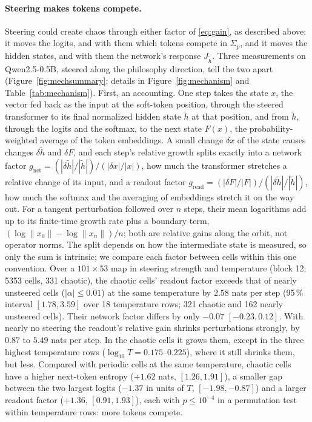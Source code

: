 \documentclass[11pt,letterpaper]{article}
\begin{document}
\paragraph{Steering makes tokens compete.} Steering could create chaos through either factor of \eqref{eq:gain}, as
described above: it moves the logits, and with them which tokens compete in $\Sigma_p$, and it moves the hidden states,
and with them the network's response $J_{\tilde h}$. Three measurements on Qwen2.5-0.5B, steered along the philosophy
direction, tell the two apart (Figure~\ref{fig:mechsummary}; details in Figure~\ref{fig:mechanism} and
Table~\ref{tab:mechanism}). First, an accounting. One step takes the state $x$, the vector fed back as the input at the
soft-token position, through the steered transformer to its final normalized hidden state $\tilde h$ at that
position, and from $\tilde h$, through the logits and the softmax, to the next state $F(x)$, the probability-weighted
average of the token embeddings. A small change $\delta x$ of the state causes changes $\delta\tilde h$ and $\delta F$,
and each step's relative growth splits exactly into a network factor
$g_{\mathrm{net}}=(|\delta\tilde h|/|\tilde h|)/(|\delta x|/|x|)$, how much the transformer stretches a relative change
of its input, and a readout factor $g_{\mathrm{read}}=(|\delta F|/|F|)/(|\delta\tilde h|/|\tilde h|)$, how much the
softmax and the averaging of embeddings stretch it on the way out. For a tangent perturbation followed over $n$ steps,
their mean logarithms add up to its finite-time growth rate plus a boundary term,
$(\log\lVert x_0\rVert-\log\lVert x_n\rVert)/n$; both are relative gains along the orbit, not operator norms. The split
depends on how the intermediate state is measured, so only the sum is intrinsic; we compare each factor between cells
within this one convention. Over a $101\times53$ map in steering strength and temperature
(block 12; 5353 cells, 331 chaotic), the chaotic cells' readout factor exceeds that of nearly unsteered cells
($|\alpha|\le0.01$) at the same temperature by $2.58$ nats per step (95\,\% interval $[1.78,3.59]$ over 18 temperature
rows; 321 chaotic and 162 nearly unsteered cells). Their network factor differs by only $-0.07$ $[-0.23,0.12]$. With
nearly no steering the readout's relative gain shrinks perturbations strongly, by $0.87$ to $5.49$ nats per step. In
the chaotic cells it grows them, except in the three highest temperature rows ($\log_{10}T=0.175$--$0.225$), where it
still shrinks them, but less. Compared with periodic cells at the same temperature,
chaotic cells have a higher next-token entropy ($+1.62$ nats, $[1.26,1.91]$), a smaller gap between the two largest
logits ($-1.37$ in units of $T$, $[-1.98,-0.87]$) and a larger readout factor ($+1.36$, $[0.91,1.93]$), each with
$p\le10^{-4}$ in a permutation test within temperature rows: more tokens compete.
\end{document}
